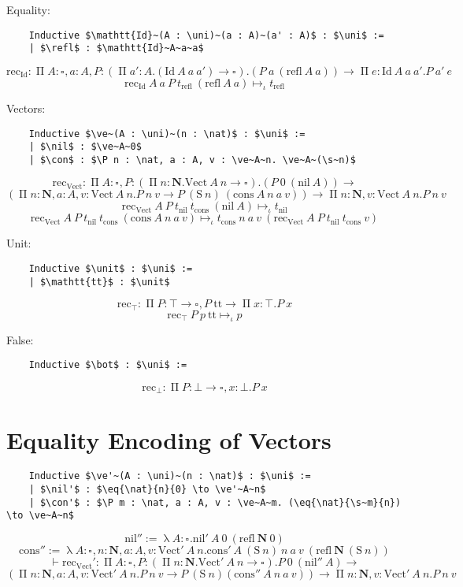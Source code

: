 \documentclass{kaobook}
\renewcommand{\mathtt}{\mathrm}
\newcommand{\uni}[1][]{\square_{#1}}
\newcommand{\red}{\mapsto}
\newcommand{\ired}{\red_\iota}
\renewcommand{\P}{\operatorname{\Pi}}
\newcommand{\unit}{\top}
\DeclareMathOperator{\?}{?}
\renewcommand{\l}{\operatorname{\lambda}}
\newcommand{\rec}{\mathtt{rec}}
\newcommand{\nat}{\mathbf{N}}
\newcommand{\s}{\mathtt{S}}
\newcommand{\eq}[3]{\mathtt{Id}_{#1}~#2~#3}
\newcommand{\refl}{\mathtt{refl}}
\newcommand{\ve}{\mathtt{Vect}}
\newcommand{\nil}{\mathtt{nil}}
\newcommand{\con}{\mathtt{cons}}
\begin{document}
{	Equality:
	\begin{lstlisting}
	Inductive $\mathtt{Id}~(A : \uni)~(a : A)~(a' : A)$ : $\uni$ :=
	| $\refl$ : $\mathtt{Id}~A~a~a$
	\end{lstlisting}
	\[\rec_{\mathtt{Id}} : \P A : \uni, a : A, P : (\P a' : A. (\mathtt{Id}~A~a~a') \to \uni). (P~a~(\refl~A~a)) \to \P e : \mathtt{Id}~A~a~a'. P~a'~e \]
	\[\rec_{\mathtt{Id}}~A~a~P~t_{\refl}~(\refl~A~a) \ired t_{\refl} \]
	
	Vectors:
	\begin{lstlisting}
	Inductive $\ve~(A : \uni)~(n : \nat)$ : $\uni$ :=
	| $\nil$ : $\ve~A~0$
	| $\con$ : $\P n : \nat, a : A, v : \ve~A~n. \ve~A~(\s~n)$
	\end{lstlisting}
	\[\rec_{\ve} : \P A : \uni, P : (\P n : \nat. \ve~A~n \to \uni). (P~0~(\nil~A)) \to\]
	\[(\P n : \nat, a : A, v : \ve~A~n. P~n~v \to P~(\s~n)~(\con~A~n~a~v)) \to \P n : \nat, v : \ve~A~n. P~n~v  \]
	\[\rec_{\ve}~A~P~t_{\nil}~t_{\con}~(\nil~A) \ired t_{\nil} \]
	\[\rec_{\ve}~A~P~t_{\nil}~t_{\con}~(\con~A~n~a~v) \ired t_{\con}~n~a~v~(\rec_{\ve}~A~P~t_{\nil}~t_{\con}~v) \]
	
	Unit:
	\begin{lstlisting}
	Inductive $\unit$ : $\uni$ :=
	| $\mathtt{tt}$ : $\unit$
	\end{lstlisting}
	\[\rec_{\unit} : \P P : \unit \to \uni, P~\mathtt{tt} \to \P x : \unit. P~x \]
	\[\rec_{\unit}~P~p~\mathtt{tt} \ired p \]
	
	False:
	\begin{lstlisting}
	Inductive $\bot$ : $\uni$ :=
	\end{lstlisting}
	\[\rec_{\bot} : \P P : \bot \to \uni, x : \bot. P~x \]

\section{Equality Encoding of Vectors}
\label{vecid}

	\begin{lstlisting}
	Inductive $\ve'~(A : \uni)~(n : \nat)$ : $\uni$ :=
	| $\nil'$ : $\eq{\nat}{n}{0} \to \ve'~A~n$
	| $\con'$ : $\P m : \nat, a : A, v : \ve~A~m. (\eq{\nat}{\s~m}{n}) \to \ve~A~n$
	\end{lstlisting}
	\[\nil'' := \l A : \uni . \nil'~A~0~(\refl~\nat~0) \]
	\[\con'' := \l A : \uni, n : \nat, a : A, v : \ve'~A~n . \con'~A~(\s~n)~n~a~v~(\refl~\nat~(\s~n))\]
	\[\vdash \rec_{\ve}' : \P A : \uni, P : (\P n : \nat. \ve'~A~n \to \uni) . P~0~(\nil''~A) \to\]
	\[(\P n : \nat, a : A, v : \ve'~A~n. P~n~v \to P~(\s~n) (\con''~A~n~a~v)) \to \P n : \nat, v : \ve'~A~n. P~n~v \]

}
\end{document}

